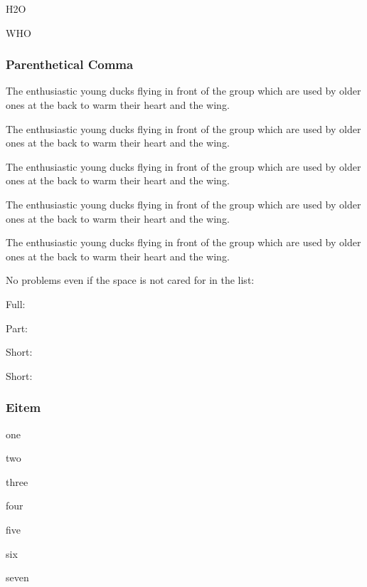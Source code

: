 \documentclass[a4paper]{article}
\begin{document}
\ac{H2O}

\ac{WHO}

\medskip

\subsubsection*{Parenthetical Comma}

The enthusiastic young ducks flying in front of the group
 which are used by older ones at the back to warm
their heart and the wing.

The enthusiastic young ducks flying in front of the group
 which are used by older ones at the back to warm
their heart and the wing.

The enthusiastic young ducks flying in front of the group
 which are used by older ones at the back to warm
their heart and the wing.

The enthusiastic young ducks flying in front of the group
 which are used by older ones at the back to warm
their heart and the wing.

The enthusiastic young ducks flying in front of the group
 which are used by older ones at the back to warm
their heart and the wing.



No problems even if the space is not cared for in the list: 



Full: 

Part: 

Short: 

Short: 

\subsubsection*{Eitem}



\begin{eitem}

\item one
\item two
\item three
\item four
\item five
\item six
\item seven

\end{eitem}
\end{document}
